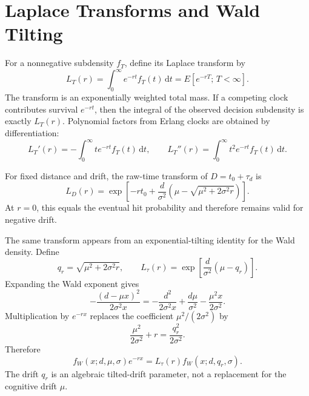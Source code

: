\documentclass[12pt]{article}
\newcommand{\dd}{\,\mathrm{d}}
\begin{document}
\section{Laplace Transforms and Wald Tilting}
\label{sec:laplace}
For a nonnegative subdensity $f_T$, define its Laplace transform by
\begin{equation}
  L_T(r)=\int_0^\infty e^{-rt}f_T(t)\dd t
  =E[e^{-rT};\,T<\infty].
\end{equation}
The transform is an exponentially weighted total mass. If a competing clock contributes survival $e^{-rt}$, then the integral of the observed decision subdensity is exactly $L_T(r)$. Polynomial factors from Erlang clocks are obtained by differentiation:
\begin{equation}
  L_T'(r)=-\int_0^\infty t e^{-rt}f_T(t)\dd t,
  \qquad
  L_T''(r)=\int_0^\infty t^2 e^{-rt}f_T(t)\dd t.
  \label{eq:laplace-derivatives}
\end{equation}

For fixed distance and drift, the raw-time transform of $D=t_0+\tau_d$ is
\begin{equation}
  L_D(r)=
  \exp\!\left[-rt_0+\frac{d}{\sigma^2}
  \left(\mu-\sqrt{\mu^2+2\sigma^2r}\right)\right].
  \label{eq:raw-wald-laplace}
\end{equation}
At $r=0$, this equals the eventual hit probability and therefore remains valid for negative drift.

The same transform appears from an exponential-tilting identity for the Wald density. Define
\begin{equation}
  q_r=\sqrt{\mu^2+2\sigma^2r},
  \qquad
  L_\tau(r)=\exp\!\left[\frac{d}{\sigma^2}(\mu-q_r)\right].
\end{equation}
Expanding the Wald exponent gives
\[
  -\frac{(d-\mu x)^2}{2\sigma^2x}
  =
  -\frac{d^2}{2\sigma^2x}
  +\frac{d\mu}{\sigma^2}
  -\frac{\mu^2x}{2\sigma^2}.
\]
Multiplication by $e^{-rx}$ replaces the coefficient $\mu^2/(2\sigma^2)$ by
\[
  \frac{\mu^2}{2\sigma^2}+r
  =
  \frac{q_r^2}{2\sigma^2}.
\]
Therefore
\begin{equation}
  f_W(x;d,\mu,\sigma)e^{-rx}
  =
  L_\tau(r)f_W(x;d,q_r,\sigma).
  \label{eq:wald-tilt}
\end{equation}
The drift $q_r$ is an algebraic tilted-drift parameter, not a replacement for the cognitive drift $\mu$.
\end{document}
